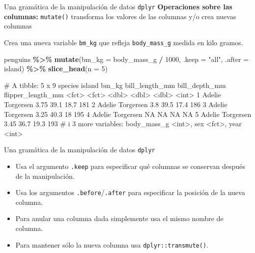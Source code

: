 \documentclass[
  ignorenonframetext,
  aspectratio=169]{beamer}
\newenvironment{Shaded}{\begin{snugshade}}{\end{snugshade}}
\newcommand{\AttributeTok}[1]{\textcolor[rgb]{0.13,0.29,0.53}{#1}}
\newcommand{\DecValTok}[1]{\textcolor[rgb]{0.00,0.00,0.81}{#1}}
\newcommand{\FunctionTok}[1]{\textcolor[rgb]{0.13,0.29,0.53}{\textbf{#1}}}
\newcommand{\NormalTok}[1]{#1}
\newcommand{\SpecialCharTok}[1]{\textcolor[rgb]{0.81,0.36,0.00}{\textbf{#1}}}
\newcommand{\StringTok}[1]{\textcolor[rgb]{0.31,0.60,0.02}{#1}}
\providecommand{\tightlist}{%
  \setlength{\itemsep}{0pt}\setlength{\parskip}{0pt}}
\let\oldverbatim\verbatim
\let\endoldverbatim\endverbatim
\renewenvironment{verbatim}{\tiny\oldverbatim}{\endoldverbatim}
\begin{document}
\begin{frame}[fragile]{Una gramática de la manipulación de datos
\texttt{dplyr}}
\label{una-gramuxe1tica-de-la-manipulaciuxf3n-de-datos-dplyr-21}
\textbf{Operaciones sobre las columnas:} \texttt{mutate()} transforma
los valores de las columnas y/o crea nuevas columnas

Crea una nueva variable \texttt{bm\_kg} que refleja
\texttt{body\_mass\_g} medida en kilo gramos.

\begin{Shaded}
\begin{Highlighting}[]
\NormalTok{penguins }\SpecialCharTok{\%\textgreater{}\%} 
  \FunctionTok{mutate}\NormalTok{(}\AttributeTok{bm\_kg =}\NormalTok{ body\_mass\_g }\SpecialCharTok{/} \DecValTok{1000}\NormalTok{, }\AttributeTok{.keep =} \StringTok{"all"}\NormalTok{, }\AttributeTok{.after =}\NormalTok{ island) }\SpecialCharTok{\%\textgreater{}\%} 
  \FunctionTok{slice\_head}\NormalTok{(}\AttributeTok{n =} \DecValTok{5}\NormalTok{)}
\end{Highlighting}
\end{Shaded}

\begin{verbatim}
# A tibble: 5 x 9
  species island    bm_kg bill_length_mm bill_depth_mm flipper_length_mm
  <fct>   <fct>     <dbl>          <dbl>         <dbl>             <int>
1 Adelie  Torgersen  3.75           39.1          18.7               181
2 Adelie  Torgersen  3.8            39.5          17.4               186
3 Adelie  Torgersen  3.25           40.3          18                 195
4 Adelie  Torgersen NA              NA            NA                  NA
5 Adelie  Torgersen  3.45           36.7          19.3               193
# i 3 more variables: body_mass_g <int>, sex <fct>, year <int>
\end{verbatim}
\end{frame}

\begin{frame}[fragile]{Una gramática de la manipulación de datos
\texttt{dplyr}}
\label{una-gramuxe1tica-de-la-manipulaciuxf3n-de-datos-dplyr-22}
\begin{itemize}
\tightlist
\item
  Usa el argumento \texttt{.keep} para especificar qué columnas se
  conservan después de la manipulación.
\item
  Usa los argumentos \texttt{.before}/\texttt{.after} para especificar
  la posición de la nueva columna.
\item
  Para anular una columna dada simplemente usa el mismo nombre de
  columna.
\item
  Para mantener sólo la nueva columna usa \texttt{dplyr::transmute()}.
\end{itemize}
\end{frame}
\end{document}
